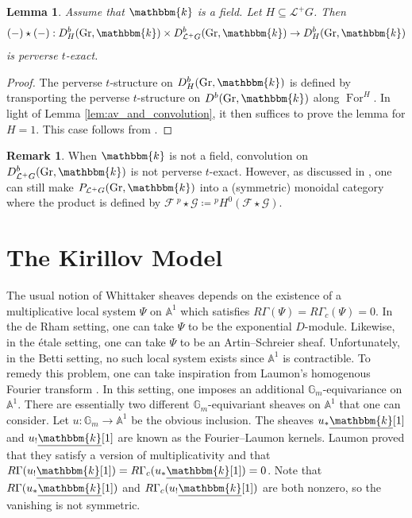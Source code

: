 \documentclass{amsart}
\renewcommand{\L}{\mathcal{L}}
\newcommand{\A}{\mathbb{A}}
\newcommand{\G}{\mathbb{G}}
\renewcommand{\k}{\mathbbm{k}}
\newcommand{\scrF}{\mathcal{F}}
\newcommand{\scrG}{\mathcal{G}}
\newcommand{\uk}{\underline{\k}}
\DeclareMathOperator{\For}{For}
\DeclareMathOperator{\Gr}{Gr}
\newtheorem{lemma}[subsubsection]{Lemma}
\theoremstyle{definition}
\newtheorem{remark}[subsubsection]{Remark}
\begin{document}
    \begin{lemma}\label{lem:H_conv_t_exactness}
        Assume that $\k$ is a field. Let $H \subseteq \L^+ G$. Then
        \[(-) \star (-) : D_H^b (\Gr, \k) \times D_{\L^+ G}^b (\Gr, \k) \to D_H^b (\Gr, \k)\]
        is perverse $t$-exact.
    \end{lemma}
    \begin{proof}
        The perverse $t$-structure on $D_H^b (\Gr, \k)$ is defined by transporting the perverse $t$-structure on $D^b (\Gr, \k)$ along $\For^H$.
        In light of Lemma \ref{lem:av_and_convolution}, it then suffices to prove the lemma for $H = 1$. This case follows from \cite[Lemma 2.3]{BGMRR}.
    \end{proof}

    \begin{remark}
    When $\k$ is not a field, convolution on $D_{\L^+ G}^b (\Gr, \k)$ is not perverse $t$-exact.
    However, as discussed in \cite{MV}, one can still make $P_{\L^+ G} (\Gr, \k)$ into a (symmetric) monoidal category where the product is defined by $\scrF \:^p\!\star \scrG \coloneq {}^p H^0 (\scrF \star \scrG)$.
    \end{remark}

    \section{The Kirillov Model}
        The usual notion of Whittaker sheaves depends on the existence of a multiplicative local system $\Psi$ on $\A^1$ which satisfies $R\Gamma (\Psi) = R\Gamma_c (\Psi) = 0$.
    In the de Rham setting, one can take $\Psi$ to be the exponential $D$-module. Likewise, in the étale setting, one can take $\Psi$ to be an Artin--Schreier sheaf.
    Unfortunately, in the Betti setting, no such local system exists since $\A^1$ is contractible. 
    To remedy this problem, one can take inspiration from Laumon's homogenous Fourier transform \cite{Lau}.
    In this setting, one imposes an additional $\G_m$-equivariance on $\A^1$. There are essentially two different $\G_m$-equivariant sheaves on $\A^1$ that one can consider.
    Let $u : \G_m \to \A^1$ be the obvious inclusion. The sheaves $u_* \uk [1]$ and $u_! \uk [1]$ are known as the Fourier--Laumon kernels.
    Laumon \cite{Lau} proved that they satisfy a version of multiplicativity and that $R\Gamma (u_! \uk [1]) = R\Gamma_c (u_* \uk [1]) = 0$.
    Note that $R\Gamma (u_* \uk [1])$ and  $R\Gamma_c (u_! \uk [1])$ are both nonzero, so the vanishing is not symmetric.
 
\end{document}
